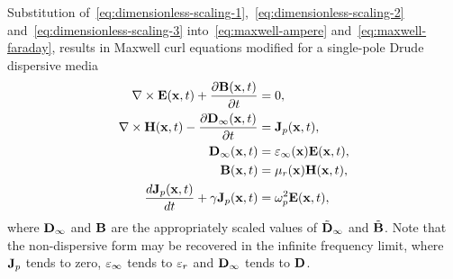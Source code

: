 Substitution of~\eqref{eq:dimensionless-scaling-1},~\eqref{eq:dimensionless-scaling-2} and~\eqref{eq:dimensionless-scaling-3} into~\eqref{eq:maxwell-ampere} and~\eqref{eq:maxwell-faraday}, results in Maxwell curl equations modified for a single-pole Drude dispersive media
\begin{subequations}
  \label{eq:dimensionless-maxwell}
  \begin{align}
    \nabla \times \mathbf{E}(\mathbf{x},t) + \frac{\partial \mathbf{B}(\mathbf{x}, t) }{\partial t} &= 0, \\
    \nabla \times \mathbf{H}(\mathbf{x},t) - \frac{\partial  \mathbf{D}_{\infty}(\mathbf{x}, t) }{\partial t} &=  \mathbf{J}_p(\mathbf{x},t), \\
    \mathbf{D}_{\infty}(\mathbf{x},t) &= \varepsilon_{\infty}(\mathbf{x}) \mathbf{E}(\mathbf{x},t), \\
    \mathbf{B}(\mathbf{x},t) &= \mu_r(\mathbf{x}) \mathbf{H}(\mathbf{x},t), \\
    \frac{d \mathbf{J}_p(\mathbf{x},t)}{d t} + \gamma \mathbf{J}_p(\mathbf{x},t) &= \omega_p^2 \mathbf{E}(\mathbf{x},t),
  \end{align}
\end{subequations}
where $\mathbf{D}_{\infty}$ and $\mathbf{B}$ are the appropriately scaled values of $\tilde{\mathbf{D}}_{\infty}$ and $\tilde{\mathbf{B}}$. Note that the non-dispersive form may be recovered in the infinite frequency limit, where $\mathbf{J}_p$ tends to zero, $\varepsilon_{\infty}$ tends to $\varepsilon_r$ and $\mathbf{D}_{\infty}$ tends to $\mathbf{D}$.

